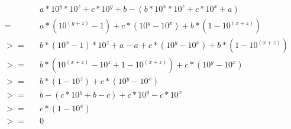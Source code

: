 \begin{equation}
\begin{split}
&    & & a*10^y*10^z + c * 10^y + b - (b*10^x*10^z + c*10^x + a) \\
& =  & & a*(10^{(y+z)} -1) + c * (10^y - 10^x) + b*(1-10^{(x+z)}) \\
& >= & & b*(10^x-1)*10^z + a - a + c * (10^y - 10^x) + b*(1-10^(x+z)) \\
& >= & & b*(10^{(x+z)}-10^z+1-10^{(x+z)}) + c * (10^y-10^x) \\
& >= & & b*(1-10^z) + c * (10^y-10^x) \\
& >= & & b - (c*10^y+b-c) + c *10^y - c * 10^x \\
& >= & & c*(1-10^x) \\
& >= & & 0
\end{split}
\end{equation}

